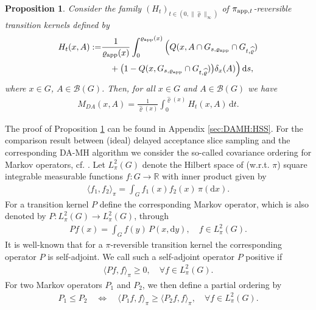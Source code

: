 \documentclass[sn-mathphys-num]{sn-jnl}%
\theoremstyle{thmstyleone}%
\newtheorem{proposition}[theorem]{Proposition}%
\theoremstyle{thmstyletwo}%
\theoremstyle{thmstylethree}%
\newcommand{\rhoapp}{\varrho_{{\rm app}}}
\begin{document}
\begin{proposition}\label{PMLR:prop:DAMH:HSS}
	Consider the family $(H_t)_{t \in (0, \|\widehat\varrho\|_\infty)}$ of $\pi_{{\rm app},t}$-reversible transition kernels defined by
	\begin{align*}
		H_t(x,A):= &\frac{1}{\rhoapp(x)} \int_0^{\rhoapp(x)} \Big(Q(x,A \cap G_{s,\rhoapp} \cap  G_{t,\widehat{\varrho}}) 
		\\ & \quad +\big(1-Q(x,G_{s,\rhoapp} \cap  G_{t,\widehat{\varrho}})\big)\delta_x(A) \Big) \, \mathrm{d}s,
	\end{align*}
	where $x\in G$, $A\in\mathcal{B}(G)$.
	Then, for all $x\in G$ and $ A\in\mathcal{B}(G)$ we have %
	\begin{align*}
		M_{DA}(x,A) = \frac{1}{\widehat\varrho(x)}\int_{0}^{\widehat\varrho(x)} H_t(x,A)\, \mathrm{d}t. 
	\end{align*}	
\end{proposition}
The proof of Proposition \ref{PMLR:prop:DAMH:HSS} can be found in Appendix \ref{sec:DAMH:HSS}.
For the comparison result between (ideal) delayed acceptance slice sampling and the corresponding DA-MH algorithm we consider the so-called covariance ordering for Markov operators, cf. \cite{Mira2001, RudolfUllrich2018}.
Let $L^2_{\pi}(G)$ denote the Hilbert space of (w.r.t. $\pi$) square integrable measurable functions $f:G\rightarrow \mathbb{R}$ with inner product given by
\begin{align*}
	\langle f_1,f_2\rangle_{\pi}=\int_{G} f_1(x) f_2(x)  \, \pi(\mathrm{d}x).	
\end{align*}
For a transition kernel $P$ define the corresponding Markov operator, which is also denoted by $P\colon L^2_{\pi}(G) \to L^2_{\pi}(G)$, through
\begin{align*}
	Pf(x)=\int_{G} f(y)  \, P(x,\mathrm{d}y), \quad f\in L^2_{\pi}(G).	
\end{align*}
It is well-known that for a $\pi$-reversible transition kernel the corresponding operator $P$ is self-adjoint. 
We call such a self-adjoint operator $P$ positive if 
\begin{align*}
	\langle Pf,f\rangle_{\pi}\geq 0, \quad \forall f\in L^2_{\pi}(G). 	
\end{align*}
For two Markov operators $P_1$ and $P_2$, we then define a partial ordering by
\begin{align}\label{PMLR:ordering}
	P_1\leq P_2
    \quad \Longleftrightarrow \quad  \langle P_1f,f \rangle_{\pi}\geq \langle P_2f,f\rangle_{\pi}, \quad \forall f\in L^2_{\pi}(G).
\end{align}
\end{document}
